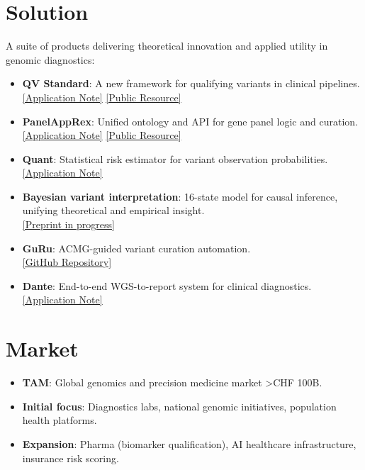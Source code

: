 \section*{Solution}
A suite of products delivering theoretical innovation and applied utility in genomic diagnostics:

\begin{itemize}[leftmargin=*]
  \item \textbf{QV Standard}: A new framework for qualifying variants in clinical pipelines.\\
    \href{https://drive.google.com/file/d/1Hx2woDKequA9k0RkVZfockgFbIDXB6El/view?usp=drivesdk}{[Application Note]} \href{https://switzerlandomics.ch/services/qv_database/}{[Public Resource]} \cite{lawless_application_2025}
  \item \textbf{PanelAppRex}: Unified ontology and API for gene panel logic and curation.\\
    \href{https://drive.google.com/file/d/1gHqq2X7Zzq1s3SQyZ4gr5krbBtqisnfI/view?usp=share_link}{[Application Note]} \href{https://switzerlandomics.ch/services/panelAppRexAi/}{[Public Resource]} \cite{lawless_panelapprex_2025}
  \item \textbf{Quant}: Statistical risk estimator for variant observation probabilities.\\
    \href{https://drive.google.com/file/d/1eerCdctsMi2gRsVxceHGaSMv2ogP0s5W/view?usp=share_link}{[Application Note]} \cite{lawless_quantifying_2025}
  \item \textbf{Bayesian variant interpretation}: 16-state model for causal inference, unifying theoretical and empirical insight.\\
    \href{https://drive.google.com/file/d/1HN_zyZidilCfq8Bkr45d-9suembRnifM/view?usp=sharing}{[Preprint in progress]}
  \item \textbf{GuRu}: ACMG-guided variant curation automation.\\
    \href{https://github.com/DylanLawless/ACMGuru}{[GitHub Repository]}
  \item \textbf{Dante}: End-to-end WGS-to-report system for clinical diagnostics.\\
    \href{https://drive.google.com/file/d/1WHOqRtPvuTukrcRl5Yn6iX7pL-Ye9R07/view?usp=share_link}{[Application Note]}
\end{itemize}

\section*{Market}
\begin{itemize}[leftmargin=*]
  \item \textbf{TAM}: Global genomics and precision medicine market >CHF 100B.
  \item \textbf{Initial focus}: Diagnostics labs, national genomic initiatives, population health platforms.
  \item \textbf{Expansion}: Pharma (biomarker qualification), AI healthcare infrastructure, insurance risk scoring.
\end{itemize}

